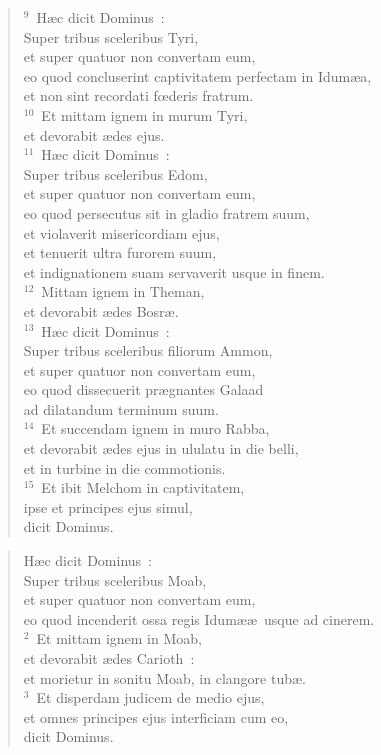 \begin{flushleft}
\begin{verse}
${}^{9}$~H\ae c dicit Dominus~:\\ Super tribus sceleribus Tyri,\\ et super quatuor non convertam eum,\\ eo quod concluserint captivitatem perfectam in Idum\ae a,\\ et non sint recordati fœderis fratrum.\\
${}^{10}$~Et mittam ignem in murum Tyri,\\ et devorabit \ae des ejus.\\
${}^{11}$~H\ae c dicit Dominus~:\\ Super tribus sceleribus Edom,\\ et super quatuor non convertam eum,\\ eo quod persecutus sit in gladio fratrem suum,\\ et violaverit misericordiam ejus,\\ et tenuerit ultra furorem suum,\\ et indignationem suam servaverit usque in finem.\\
${}^{12}$~Mittam ignem in Theman,\\ et devorabit \ae des Bosr\ae .\\
${}^{13}$~H\ae c dicit Dominus~:\\ Super tribus sceleribus filiorum Ammon,\\ et super quatuor non convertam eum,\\ eo quod dissecuerit pr\ae gnantes Galaad\\ ad dilatandum terminum suum.\\
${}^{14}$~Et succendam ignem in muro Rabba,\\ et devorabit \ae des ejus in ululatu in die belli,\\ et in turbine in die commotionis.\\
${}^{15}$~Et ibit Melchom in captivitatem,\\ ipse et principes ejus simul,\\ dicit Dominus.\end{verse}\end{flushleft}


\begin{flushleft}\begin{verse}\vspace{-19pt}H\ae c dicit Dominus~:\\ Super tribus sceleribus Moab,\\ et super quatuor non convertam eum,\\ eo quod incenderit ossa regis Idum\ae \ae\ usque ad cinerem.\\
${}^{2}$~Et mittam ignem in Moab,\\ et devorabit \ae des Carioth~:\\ et morietur in sonitu Moab, in clangore tub\ae .\\
${}^{3}$~Et disperdam judicem de medio ejus,\\ et omnes principes ejus interficiam cum eo,\\ dicit Dominus.\end{verse}\end{flushleft}


